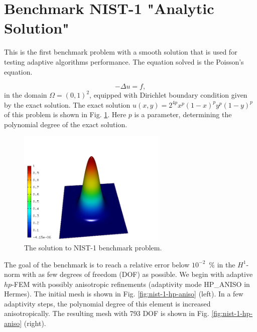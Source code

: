 \section{Benchmark NIST-1 "Analytic Solution"}
\label{sec:bench-1}

This is the first benchmark problem with a smooth solution
that is used for testing adaptive algorithms performance.
The equation solved is the Poisson's equation.

\begin{equation} \label{poisson}
-\Delta u = f,
\end{equation}
in the domain $\Omega = (0, 1)^2$, equipped with Dirichlet
boundary condition given by the exact solution.
The exact solution $u(x, y) = 2^{4p}x^{p}(1-x)^{p}y^{p}(1-y)^{p}$
of this problem is shown in Fig. \ref{fig:sln-nist01}.
Here $p$ is a parameter, determining the polynomial degree of the exact solution.

\begin{figure}[!ht]
\centering
\includegraphics[height=5.5cm]{nist/nist-1/solution.png}
\caption{The solution to NIST-1 benchmark problem.}
\label{fig:sln-nist01}
\end{figure}
\noindent
The goal of the benchmark is to reach a relative error below
$10^{-2}$~\% in the $H^1$-norm with as few degrees of freedom (DOF)
as possible.
We begin with adaptive $hp$-FEM with possibly anisotropic refinements (adaptivity mode
HP\_ANISO in {\sc Hermes}). The initial mesh is shown in Fig. \ref{fig:nist-1-hp-aniso} (left).
In a few adaptivity steps, the polynomial degree of this element is increased
anisotropically.
The resulting mesh with 793 DOF is shown in Fig. \ref{fig:nist-1-hp-aniso} (right).

